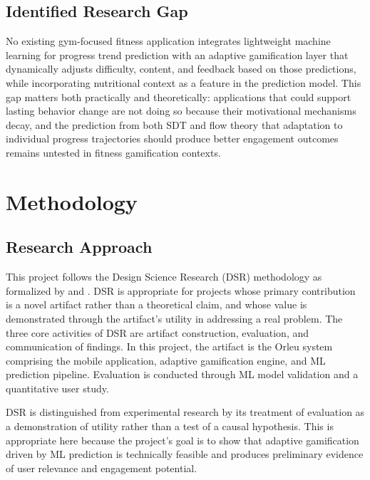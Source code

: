 \documentclass[12pt, a4paper]{report}
\begin{document}
\section{Identified Research Gap}

No existing gym-focused fitness application integrates lightweight machine learning for progress trend prediction with an adaptive gamification layer that dynamically adjusts difficulty, content, and feedback based on those predictions, while incorporating nutritional context as a feature in the prediction model. This gap matters both practically and theoretically: applications that could support lasting behavior change are not doing so because their motivational mechanisms decay, and the prediction from both SDT and flow theory that adaptation to individual progress trajectories should produce better engagement outcomes remains untested in fitness gamification contexts.

\chapter{Methodology}
\label{ch:methodology}

\section{Research Approach}

This project follows the Design Science Research (DSR) methodology as formalized by \citet{hevner2004} and \citet{peffers2007}. DSR is appropriate for projects whose primary contribution is a novel artifact rather than a theoretical claim, and whose value is demonstrated through the artifact's utility in addressing a real problem. The three core activities of DSR are artifact construction, evaluation, and communication of findings. In this project, the artifact is the Orleu system comprising the mobile application, adaptive gamification engine, and ML prediction pipeline. Evaluation is conducted through ML model validation and a quantitative user study.

DSR is distinguished from experimental research by its treatment of evaluation as a demonstration of utility rather than a test of a causal hypothesis. This is appropriate here because the project's goal is to show that adaptive gamification driven by ML prediction is technically feasible and produces preliminary evidence of user relevance and engagement potential.
\end{document}
